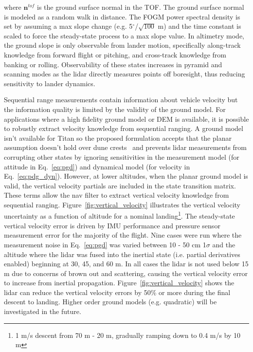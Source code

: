 \noindent where $\bm{n}^{tof}$ is the ground surface normal in the TOF. The ground surface normal is modeled as a random walk in distance. The FOGM power spectral density is set by assuming a max slope change (e.g. 5$^\circ$/$\sqrt{100}$ m) and the time constant is scaled to force the steady-state process to a max slope value. In altimetry mode, the ground slope is only observable from lander motion, specifically along-track knowledge from forward flight or pitching, and cross-track knowledge from banking or rolling. Observability of these states increases in pyramid and scanning modes as the lidar directly measures points off boresight, thus reducing sensitivity to lander dynamics. 

Sequential range measurements contain information about vehicle velocity but the information quality is limited by the validity of the ground model. For applications where a high fidelity ground model or \ac{DEM} is available, it is possible to robustly extract velocity knowledge from sequential ranging. A ground model isn't available for Titan so the proposed formulation accepts that the planar assumption doesn't hold over dune crests~\cite{Lorenz_2021} and prevents lidar measurements from corrupting other states by ignoring sensitivities in the measurement model (for attitude in Eq.~\ref{eq:pgd}) and dynamical model (for velocity in Eq.~\ref{eq:pdg_dyn}). However, at lower altitudes, when the planar ground model is valid, the vertical velocity partials are included in the state transition matrix. These terms allow the nav filter to extract vertical velocity knowledge from sequential ranging. Figure~\ref{fig:vertical_velocity} illustrates the vertical velocity uncertainty as a function of altitude for a nominal landing\footnote{1 m/s descent from 70 m - 20 m, gradually ramping down to 0.4 m/s by 10 m}. The steady-state vertical velocity error is driven by IMU performance and pressure sensor measurement error for the majority of the flight. Nine cases were run where the measurement noise in Eq.~\ref{eq:pgd} was varied between 10 - 50 cm 1$\sigma$ and the altitude where the lidar was fused into the inertial state (i.e. partial derivatives enabled) beginning at 30, 45, and 60 m. In all cases the lidar is not used below 15 m due to concerns of brown out and scattering, causing the vertical velocity error to increase from inertial propagation. Figure~\ref{fig:vertical_velocity} shows the lidar can reduce the vertical velocity errors by 50\% or more during the final descent to landing. Higher order ground models (e.g. quadratic) will be investigated in the future. 
